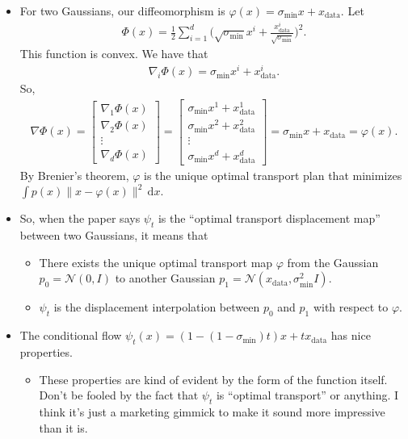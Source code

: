 \documentclass[10pt]{article}
\newcommand{\dee}{\mathrm{d}}
\newcommand{\mcal}[1]{\mathcal{#1}}
\newcommand{\data}{\mathrm{data}}
\begin{document}
\begin{itemize}
  \item For two Gaussians, our diffeomorphism is $\varphi(x) = \sigma_{\min} x + x_{\data}$. Let
  \begin{align*}
    \Phi(x) = \frac{1}{2} \sum_{i=1}^d \bigg(\sqrt{\sigma_{\min}} x^i + \frac{x^i_{\data}}{\sqrt{\sigma_{\min}}} \bigg)^2.
  \end{align*}
  This function is convex. We have that
  \begin{align*}
    \nabla_i \Phi(x) = \sigma_{\min} x^i + x^i_{\data}.
  \end{align*}
  So,
  \begin{align*}
    \nabla \Phi(x) = \begin{bmatrix}
      \nabla_1 \Phi(x) \\
      \nabla_2 \Phi(x) \\
      \vdots \\
      \nabla_d \Phi(x)
    \end{bmatrix}
    = \begin{bmatrix}
      \sigma_{\min} x^1 + x^1_{\data} \\
      \sigma_{\min} x^2 + x^2_{\data} \\
      \vdots \\
      \sigma_{\min} x^d + x^d_{\data} 
    \end{bmatrix}
    = \sigma_{\min} x + x_{\data}
    = \varphi(x).
  \end{align*}
  By Brenier's theorem, $\varphi$ is the unique optimal transport plan that minimizes $\int p(x) \| x - \varphi(x) \|^2\, \dee x$.

  \item So, when the paper says $\psi_t$ is the ``optimal transport displacement map'' between two Gaussians, it means that
  \begin{itemize}
    \item There exists the unique optimal transport map $\varphi$ from the Gaussian $p_0 = \mcal{N}(0,I)$ to another Gaussian $p_1 = \mcal{N}(x_{\data},\sigma_{\min}^2 I)$.
    \item $\psi_t$ is the displacement interpolation between $p_0$ and $p_1$ with respect to $\varphi$.
  \end{itemize}

  \item The conditional flow $\psi_t(x) = (1 - (1-\sigma_{\min})t) x + tx_{\data}$ has nice properties.
  \begin{itemize}
    \item These properties are kind of evident by the form of the function itself. Don't be fooled by the fact that $\psi_t$ is ``optimal transport'' or anything. I think it's just a marketing gimmick to make it sound more impressive than it is.
    

\end{itemize}
\end{itemize}
\end{document}
